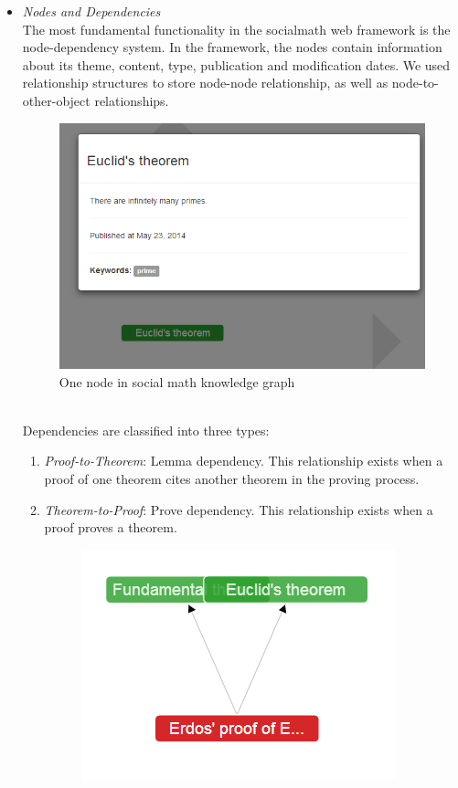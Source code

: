 \documentclass{acm_proc_article-sp}
\begin{document}
\begin{itemize}

\item \emph{Nodes and Dependencies} \\
The most fundamental functionality in the socialmath web framework is the node-dependency system. In the framework, the nodes contain information about its theme, content, type, publication and modification dates. We used relationship structures to store node-node relationship, as well as node-to-other-object relationships. 
\begin{figure}[h!]
\centering
\includegraphics[scale=0.5]{oneNode.png}
\caption{One node in social math knowledge graph}
\end{figure}\\
Dependencies are classified into three types:
\begin{enumerate}
\item \emph{Proof-to-Theorem}: Lemma dependency. This relationship exists when a proof of one theorem cites another theorem in the proving process. 
\item \emph{Theorem-to-Proof}: Prove dependency. This relationship exists when a proof proves a theorem. 
\begin{figure}[h!]
\centering
\includegraphics[scale=0.3]{prove_lemma_relationship.png}

\end{figure}
\end{enumerate}
\end{itemize}
\end{document}
